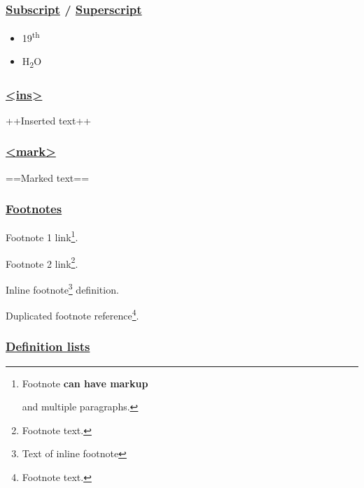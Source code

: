 \documentclass[
  paper=a4,
  ,captions=tableheading
]{scrartcl}
\providecommand{\tightlist}{%
  \setlength{\itemsep}{0pt}\setlength{\parskip}{0pt}}
\begin{document}
\hypertarget{subscript-superscript}{%
\subsubsection{\texorpdfstring{\href{https://github.com/markdown-it/markdown-it-sub}{Subscript}
/
\href{https://github.com/markdown-it/markdown-it-sup}{Superscript}}{Subscript / Superscript}}\label{subscript-superscript}}

\begin{itemize}
\tightlist
\item
  19\textsuperscript{th}
\item
  H\textsubscript{2}O
\end{itemize}

\hypertarget{ins}{%
\subsubsection{\texorpdfstring{\href{https://github.com/markdown-it/markdown-it-ins}{\textless ins\textgreater{}}}{\textless ins\textgreater{}}}\label{ins}}

++Inserted text++

\hypertarget{mark}{%
\subsubsection{\texorpdfstring{\href{https://github.com/markdown-it/markdown-it-mark}{\textless mark\textgreater{}}}{\textless mark\textgreater{}}}\label{mark}}

==Marked text==

\hypertarget{footnotes}{%
\subsubsection{\texorpdfstring{\href{https://github.com/markdown-it/markdown-it-footnote}{Footnotes}}{Footnotes}}\label{footnotes}}

Footnote 1 link\footnote{Footnote \textbf{can have markup}

  and multiple paragraphs.}.

Footnote 2 link\footnote{Footnote text.}.

Inline footnote\footnote{Text of inline footnote} definition.

Duplicated footnote reference\footnote{Footnote text.}.

\hypertarget{definition-lists}{%
\subsubsection{\texorpdfstring{\href{https://github.com/markdown-it/markdown-it-deflist}{Definition
lists}}{Definition lists}}\label{definition-lists}}
\end{document}
